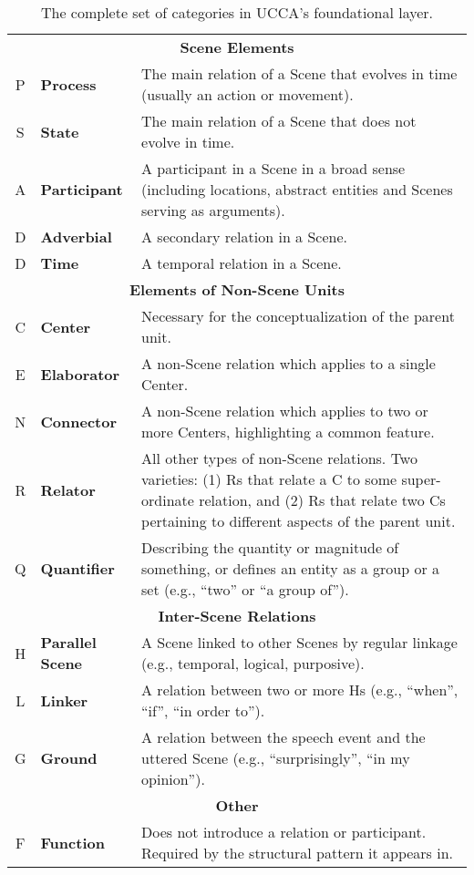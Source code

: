 \documentclass[11pt,a4paper]{article}
\begin{document}
\begin{table}[h]
\centering
\footnotesize
\begin{tabular}{cp{1.6cm}p{12.5cm}}
\multicolumn{3}{c}{\bf Scene Elements}\\
P & {\bf Process} & The main relation of a Scene that evolves in time (usually an action or movement).\\
S & {\bf State} & The main relation of a Scene that does not evolve in time.\\
A & {\bf Participant} & A participant in a Scene in a broad sense (including locations, abstract entities and Scenes serving as arguments).\\
D & {\bf Adverbial} & A secondary relation in a Scene.\\
D & {\bf Time} & A temporal relation in a Scene.\\
\multicolumn{3}{c}{{\bf Elements of Non-Scene Units}}\\
C & {\bf Center} & Necessary for the conceptualization of the parent unit.\\
E & {\bf Elaborator} & A non-Scene relation which applies to a single Center.\\
N & {\bf Connector} & A non-Scene relation which applies to two or more Centers, highlighting a common feature.\\
R & {\bf Relator} & All other types of non-Scene relations. Two varieties: (1) Rs that relate a C to some super-ordinate relation, and
(2) Rs that relate two Cs pertaining to different aspects of the parent unit. \\
Q & {\bf Quantifier} & Describing the quantity or magnitude of something, or defines an entity as a group or a set (e.g., ``two'' or ``a group of'').\\
\multicolumn{3}{c}{\bf Inter-Scene Relations}\\
H & {\bf Parallel Scene} & A Scene linked to other Scenes by regular linkage (e.g., temporal, logical, purposive).\\
L & {\bf Linker} & A relation between two or more Hs (e.g., ``when'', ``if'', ``in order to'').\\
G & {\bf Ground} & A relation between the speech event and the uttered Scene (e.g., ``surprisingly'', ``in my opinion'').\\
\multicolumn{3}{c}{\bf Other}\\
F & {\bf Function} & Does not introduce a relation or participant. Required by the structural pattern it appears in.
\end{tabular}
\caption{The complete set of categories in UCCA's foundational layer.\label{tab:ucca}}
\end{table}
\end{document}
